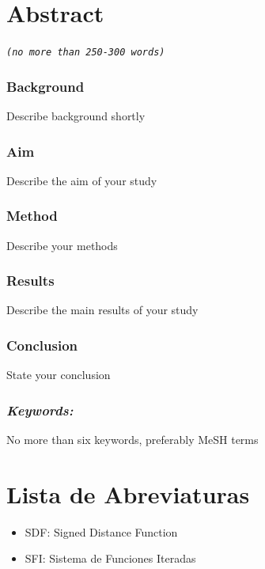 \documentclass[11pt]{report}
\begin{document}
\chapter*{Abstract}

\thispagestyle{empty}

\textit{\texttt{(no more than 250-300 words)}}

\subsection*{Background}
Describe background shortly

\subsection*{Aim}
Describe the aim of your study

\subsection*{Method}
Describe your methods

\subsection*{Results}
Describe the main results of your study

\subsection*{Conclusion}
State your conclusion

\subsection*{\emph{Keywords:}} No more than six keywords, preferably MeSH terms


\tableofcontents
\setcounter{page}{1}
\thispagestyle{plain}



\chapter*{Lista de Abreviaturas}

\begin{itemize}
\item SDF: Signed Distance Function
\item SFI: Sistema de Funciones Iteradas
\end{itemize}
\end{document}

